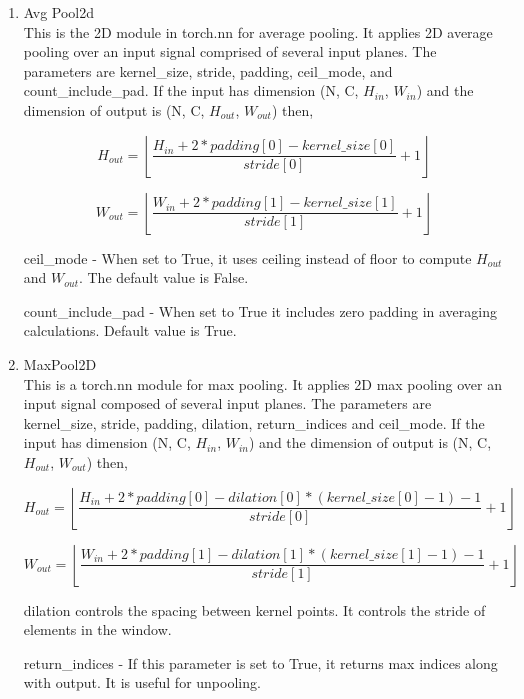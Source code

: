 \documentclass{article}
\begin{document}
\begin{enumerate}
    
    \item Avg Pool2d \\

    This is the 2D  module in torch.nn for average pooling. It applies 2D average pooling over an input signal comprised of several input planes. 
    The parameters are kernel\_size, stride, padding, ceil\_mode, and count\_include\_pad. 
    If the input has dimension (N, C, $H_{in}$, $W_{in}$) and the dimension of output is (N, C, $H_{out}$, $W_{out}$) then,  
    
    \[
    H_{out} = \left \lfloor{
    \frac{H_{in} + 2 * padding[0] - kernel\_size[0]}{stride[0]} + 1}\right \rfloor
    \]
    
    \[
    W_{out} = \left \lfloor{
    \frac{W_{in} + 2 * padding[1] - kernel\_size[1]}{stride[1]} + 1}\right \rfloor
    \]
    
    ceil\_mode - When set to True, it uses ceiling instead of floor to compute $H_{out}$ and $W_{out}$. The default value is False. 
    
    count\_include\_pad - When set to True it includes zero padding in averaging calculations. Default value is True. 

    \item MaxPool2D \\

    This is a torch.nn module for max pooling. It applies 2D max pooling over an input signal composed of several input planes. 
    The parameters are kernel\_size, stride, padding, dilation, return\_indices and ceil\_mode. 
    If the input has dimension (N, C, $H_{in}$, $W_{in}$) and the dimension of output is (N, C, $H_{out}$, $W_{out}$) then,  
    
    \[
    H_{out} = \left \lfloor{ 
    \frac{H_{in} + 2 * padding[0] - dilation[0] * (kernel\_size[0] -1) -1}{stride[0]}} + 1 \right \rfloor
    \]
    
    \[
    W_{out} = \left \lfloor{  
    \frac{W_{in} + 2 * padding[1] - dilation[1] * (kernel\_size[1] -1) -1}{stride[1]}} + 1 \right \rfloor 
    \]
    
    dilation controls the spacing between kernel points. It controls the stride of elements in the window. 
    
    
    return\_indices - If this parameter is set to True, it returns max indices along with output. It is useful for unpooling. 
    


\end{enumerate}
\end{document}
